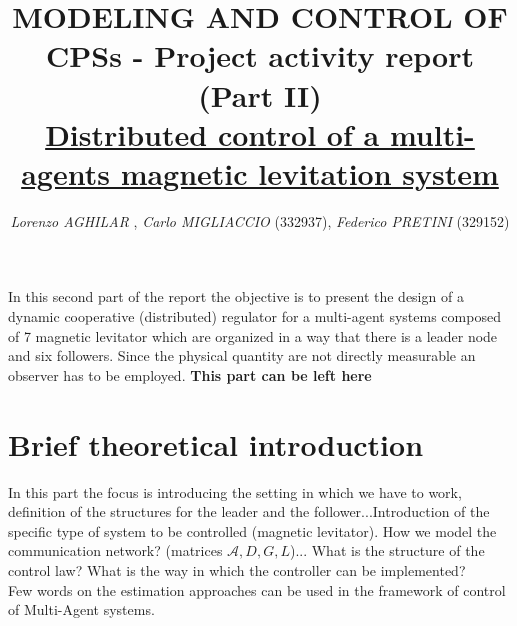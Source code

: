 \documentclass[a4paper,11pt]{article}
\begin{document}
    
    \title{
        \linespread{0.3}
        \vspace{-2.5cm}
        \textbf{
        {\large{MODELING AND CONTROL OF CPSs}  - \Large {Project activity report (Part II)}}\\
        {\Large \underline{\textsf{Distributed control of a multi-agents magnetic levitation system}}}
        }
        \vspace{-0.5em}
    }
    \author{
        \textit{
            \normalsize 
        Lorenzo AGHILAR} ,
        \textit{Carlo MIGLIACCIO} (332937), 
        \textit{Federico PRETINI} (329152)}
    
    \date{}

    \clearpage\maketitle
    \thispagestyle{empty}
    \vspace{-2em}

    {
        \centering
        \noindent
        \textsf{        
            In this second part of the report the objective is to present the design of a dynamic cooperative (distributed) regulator for a multi-agent systems composed of 7 magnetic levitator which are organized in a way that there is a leader node and six followers. Since the physical quantity are not directly measurable an observer has to be employed.} \textbf{\color{red} This part can be left here} 
    }
   
    \section*{Brief theoretical introduction}
    \textsf{
    In this part the focus is introducing the setting in which we have to work, definition of the structures for the leader and the follower...Introduction of the specific type of system to be controlled (magnetic levitator).
    How we model the communication network? (matrices $\mathcal{A}, D, G, L$)...
    What is the structure of the control law? What is the way in which the controller can be implemented?\\
    Few words on the estimation approaches can be used in the framework of control of Multi-Agent systems.}
\end{document}
